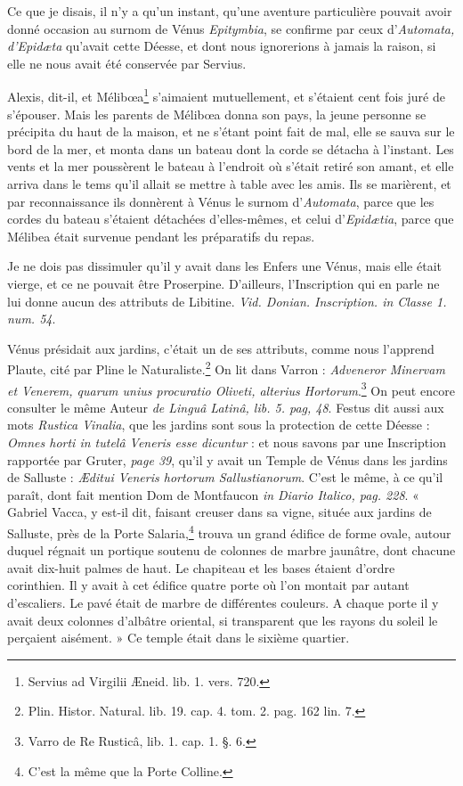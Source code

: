 \documentclass[a4paper, 18pt, oneside]{article}
\begin{document}
Ce que je disais, il n'y a qu'un instant, qu'une aventure particulière pouvait avoir donné occasion au surnom de Vénus \emph{Epitymbia}, se confirme par ceux d'\emph{Automata, d'Epidæta} qu'avait cette Déesse, et dont nous ignorerions à jamais la raison, si elle ne nous avait été conservée par Servius.

Alexis, dit-il, et Mélibœa\footnote{Servius ad Virgilii Æneid. lib. 1. vers. 720.} s'aimaient mutuellement, et s'étaient cent fois juré de s'épouser. Mais les parents de Mélibœa donna son pays, la jeune personne se précipita du haut de la maison, et ne s'étant point fait de mal, elle se sauva sur le bord de la mer, et monta dans un bateau dont la corde se détacha à l'instant. Les vents et la mer poussèrent le bateau à l'endroit où s'était retiré son amant, et elle arriva dans le tems qu'il allait se mettre à table avec les amis. Ils se marièrent, et par reconnaissance ils donnèrent à Vénus le surnom d'\emph{Automata}, parce que les cordes du bateau s'étaient détachées d'elles-mêmes, et celui d'\emph{Epidætia}, parce que Mélibea était survenue pendant les préparatifs du repas.

Je ne dois pas dissimuler qu'il y avait dans les Enfers une Vénus, mais elle était vierge, et ce ne pouvait être Proserpine. D'ailleurs, l'Inscription qui en parle ne lui donne aucun des attributs de Libitine. \emph{Vid. Donian. Inscription. in Classe 1. num. 54}.

Vénus présidait aux jardins, c'était un de ses attributs, comme nous l'apprend Plaute, cité par Pline le Naturaliste.\footnote{Plin. Histor. Natural. lib. 19. cap. 4. tom. 2. pag. 162 lin. 7.} On lit dans Varron : \emph{Adveneror Minervam et Venerem, quarum unius procuratio Oliveti, alterius Hortorum}.\footnote{Varro de Re Rusticâ, lib. 1. cap. 1. §. 6.} On peut encore consulter le même Auteur \emph{de Linguâ Latinâ, lib. 5. pag, 48}. Festus dit aussi aux mots \emph{Rustica Vinalia}, que les jardins sont sous la protection de cette Déesse : \emph{Omnes horti in tutelâ Veneris esse dicuntur} : et nous savons par une Inscription rapportée par Gruter, \emph{page 39}, qu'il y avait un Temple de Vénus dans les jardins de Salluste : \emph{Æditui Veneris hortorum Sallustianorum}. C'est le même, à ce qu'il paraît, dont fait mention Dom de Montfaucon \emph{in Diario Italico, pag. 228}. « Gabriel Vacca, y est-il dit, faisant creuser dans sa vigne, située aux jardins de Salluste, près de la Porte Salaria,\footnote{C'est la même que la Porte Colline.} trouva un grand édifice de forme ovale, autour duquel régnait un portique soutenu de colonnes de marbre jaunâtre, dont chacune avait dix-huit palmes de haut. Le chapiteau et les bases étaient d'ordre corinthien. Il y avait à cet édifice quatre porte où l'on montait par autant d'escaliers. Le pavé était de marbre de différentes couleurs. A chaque porte il y avait deux colonnes d'albâtre oriental, si transparent que les rayons du soleil le perçaient aisément. » Ce temple était dans le sixième quartier.
\end{document}

